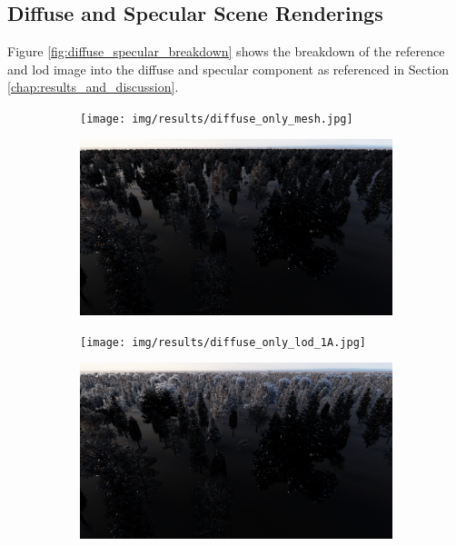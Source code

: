 \chapter{}
\section{Diffuse and Specular Scene Renderings}
\label{sec:diffuse_and_specular_scene_renderings}
Figure \ref{fig:diffuse_specular_breakdown} shows the breakdown of the reference and \ac{lod} image into the diffuse and specular component as referenced in Section \ref{chap:results_and_discussion}.
\begin{figure}[ht]
    \centering
    \begin{subfigure}[b]{0.49\linewidth}
        \centering
        \texttt{[image: img/results/diffuse\_only\_mesh.jpg]}
        \caption{}
    \end{subfigure}
    \begin{subfigure}[b]{0.49\linewidth}
        \centering
        \includegraphics[width=1\linewidth]{img/results/specular_only_mesh.jpg}
        \caption{}
    \end{subfigure}
    \begin{subfigure}[b]{0.49\linewidth}
        \centering
        \texttt{[image: img/results/diffuse\_only\_lod\_1A.jpg]}
        \caption{}
    \end{subfigure}
    \begin{subfigure}[b]{0.49\linewidth}
        \centering
        \includegraphics[width=1\linewidth]{img/results/specular_only_lod_1A.jpg}

\end{subfigure}
\end{figure}
